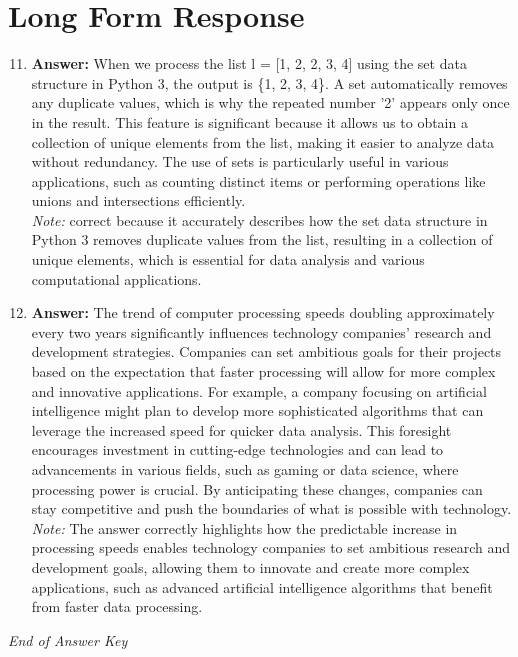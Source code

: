 \documentclass[12pt]{article}
\begin{document}
\section*{Long Form Response}
\begin{enumerate}[label=\arabic*.]
\setcounter{enumi}{10}
\item \textbf{Answer:} When we process the list l = [1, 2, 2, 3, 4] using the set data structure in Python 3, the output is \{1, 2, 3, 4\}. A set automatically removes any duplicate values, which is why the repeated number '2' appears only once in the result. This feature is significant because it allows us to obtain a collection of unique elements from the list, making it easier to analyze data without redundancy. The use of sets is particularly useful in various applications, such as counting distinct items or performing operations like unions and intersections efficiently.
\\ \textit{Note:} correct because it accurately describes how the set data structure in Python 3 removes duplicate values from the list, resulting in a collection of unique elements, which is essential for data analysis and various computational applications.
\item \textbf{Answer:} The trend of computer processing speeds doubling approximately every two years significantly influences technology companies' research and development strategies. Companies can set ambitious goals for their projects based on the expectation that faster processing will allow for more complex and innovative applications. For example, a company focusing on artificial intelligence might plan to develop more sophisticated algorithms that can leverage the increased speed for quicker data analysis. This foresight encourages investment in cutting-edge technologies and can lead to advancements in various fields, such as gaming or data science, where processing power is crucial. By anticipating these changes, companies can stay competitive and push the boundaries of what is possible with technology.
\\ \textit{Note:} The answer correctly highlights how the predictable increase in processing speeds enables technology companies to set ambitious research and development goals, allowing them to innovate and create more complex applications, such as advanced artificial intelligence algorithms that benefit from faster data processing.
\end{enumerate}

\vfill
\noindent\textit{End of Answer Key}
\end{document}
